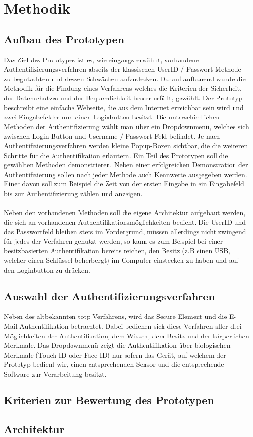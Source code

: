 \chapter{Methodik}
\section{Aufbau des Prototypen}
Das Ziel des Prototypes ist es, wie eingangs erwähnt, vorhandene Authentifizierungsverfahren abseits der klassischen UserID / Passwort Methode zu begutachten und dessen Schwächen aufzudecken. Darauf aufbauend wurde die Methodik für die Findung eines Verfahrens welches die Kriterien der Sicherheit, des Datenschutzes und der Bequemlichkeit besser erfüllt, gewählt. Der Prototyp beschreibt eine einfache Webseite, die aus dem Internet erreichbar sein wird und zwei Eingabefelder und einen Loginbutton besitzt. Die unterschiedlichen Methoden der Authentifizierung wählt man über ein Dropdownmenü, welches sich zwischen Login-Button und Username / Passwort Feld befindet. Je nach Authentifizierungsverfahren werden kleine Popup-Boxen sichtbar, die die weiteren Schritte für die Authentifikation erläutern.
Ein Teil des Prototypen soll die gewählten Methoden demonstrieren. Neben einer erfolgreichen Demonstration der Authentifizierung sollen nach jeder Methode auch Kennwerte ausgegeben werden. Einer davon soll zum Beispiel die Zeit von der ersten Eingabe in ein Eingabefeld bis zur Authentifizierung zählen und anzeigen. \\
\\
Neben den vorhandenen Methoden soll die eigene Architektur aufgebaut werden, die sich an vorhandenen Authentifikationsmöglichkeiten bedient. Die UserID und das Passwortfeld bleiben stets im Vordergrund, müssen allerdings nicht zwingend für jedes der Verfahren genutzt werden, so kann es zum Beispiel bei einer besitzbasierten Authentifikation bereits reichen, den Besitz (z.B einen USB, welcher einen Schlüssel beherbergt) im Computer einstecken zu haben und auf den Loginbutton zu drücken.

\section{Auswahl der Authentifizierungsverfahren}
Neben des altbekannten \ac{totp} Verfahrens, wird das Secure Element und die E-Mail Authentifikation betrachtet. Dabei bedienen sich diese Verfahren aller drei Möglichkeiten der Authentifikation, dem Wissen, dem Besitz und der körperlichen Merkmale. Das Dropdownmenü zeigt die Authentifikation über biologischen Merkmale (Touch ID oder Face ID) nur sofern das Gerät, auf welchem der Prototyp bedient wir, einen entsprechenden Sensor und die entsprechende Software zur Verarbeitung besitzt.

\section{Kriterien zur Bewertung des Prototypen}
\section{Architektur}

